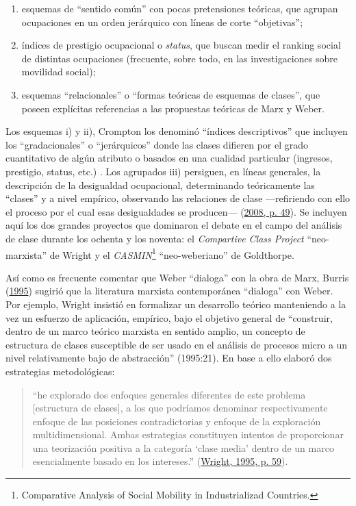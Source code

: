 \documentclass[
]{article}
\providecommand{\tightlist}{%
  \setlength{\itemsep}{0pt}\setlength{\parskip}{0pt}}
\begin{document}
\begin{enumerate}
\def\labelenumi{\roman{enumi}.}
\tightlist
\item
  esquemas de ``sentido común'' con pocas pretensiones teóricas, que agrupan ocupaciones en un orden jerárquico con líneas de corte ``objetivas'';
\item
  índices de prestigio ocupacional o \emph{status}, que buscan medir el ranking social de distintas ocupaciones (frecuente, sobre todo, en las investigaciones sobre movilidad social);
\item
  esquemas ``relacionales'' o ``formas teóricas de esquemas de clases'', que poseen explícitas referencias a las propuestas teóricas de Marx y Weber.
\end{enumerate}

Los esquemas i) y ii), Crompton los denominó ``índices descriptivos'' que incluyen los ``gradacionales'' o ``jerárquicos'' donde las clases difieren por el grado cuantitativo de algún atributo o basados en una cualidad particular (ingresos, prestigio, status, etc.) . Los agrupados iii) persiguen, en líneas generales, la descripción de la desigualdad ocupacional, determinando teóricamente las ``clases'' y a nivel empírico, observando las relaciones de clase ---refiriendo con ello el proceso por el cual esas desigualdades se producen--- (\protect\hyperlink{ref-Crompton2008}{2008, p. 49}). Se incluyen aquí los dos grandes proyectos que dominaron el debate en el campo del análisis de clase durante los ochenta y los noventa: el \emph{Compartive Class Project} ``neo-marxista'' de Wright y el \emph{CASMIN}\footnote{Comparative Analysis of Social Mobility in Industrializad Countries.} ``neo-weberiano'' de Goldthorpe.

Así como es frecuente comentar que Weber ``dialoga'' con la obra de Marx, Burris (\protect\hyperlink{ref-Burris1995}{1995}) sugirió que la literatura marxista contemporánea ``dialoga'' con Weber. Por ejemplo, Wright insistió en formalizar un desarrollo teórico manteniendo a la vez un esfuerzo de aplicación, empírico, bajo el objetivo general de ``construir, dentro de un marco teórico marxista en sentido amplio, un concepto de estructura de clases susceptible de ser usado en el análisis de procesos micro a un nivel relativamente bajo de abstracción'' (1995:21). En base a ello elaboró dos estrategias metodológicas:

\begin{quote}
``he explorado dos enfoques generales diferentes de este problema {[}estructura de clases{]}, a los que podríamos denominar respectivamente enfoque de las posiciones contradictorias y enfoque de la exploración multidimensional. Ambas estrategias constituyen intentos de proporcionar una teorización positiva a la categoría `clase media' dentro de un marco esencialmente basado en los intereses.'' (\protect\hyperlink{ref-Wright1995a}{Wright, 1995, p. 59}).
\end{quote}
\end{document}
